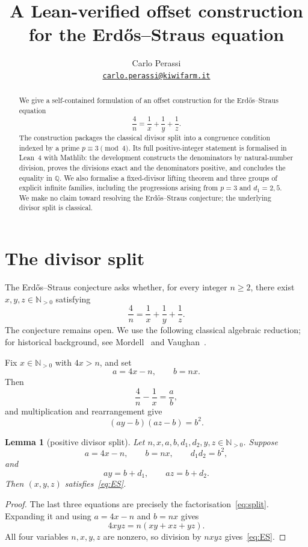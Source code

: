\documentclass[11pt]{article}
\title{A Lean-verified offset construction\\
for the Erdős--Straus equation}
\author{Carlo Perassi\\
\href{mailto:carlo.perassi@kiwifarm.it}{\texttt{carlo.perassi@kiwifarm.it}}}
\date{}
\newtheorem{lemma}[theorem]{Lemma}
\theoremstyle{remark}
\newcommand{\N}{\mathbb{N}}
\newcommand{\Q}{\mathbb{Q}}
\begin{document}
\maketitle

\begin{abstract}
We give a self-contained formulation of an offset construction for the
Erdős--Straus equation
\[
  \frac4n=\frac1x+\frac1y+\frac1z.
\]
The construction packages the classical divisor split into a congruence
condition indexed by a prime \(p\equiv3\pmod4\).  Its full positive-integer
statement is formalised in Lean~4 with Mathlib: the development constructs the
denominators by natural-number division, proves the divisions exact and the
denominators positive, and concludes the equality in \(\Q\).  We also formalise
a fixed-divisor lifting theorem and three groups of explicit infinite families,
including the progressions arising from \(p=3\) and \(d_1=2,5\).  We make no
claim toward resolving the Erdős--Straus conjecture; the underlying divisor
split is classical.
\end{abstract}

\section{The divisor split}

The Erdős--Straus conjecture asks whether, for every integer \(n\ge2\), there
exist \(x,y,z\in\N_{>0}\) satisfying
\begin{equation}\label{eq:ES}
  \frac4n=\frac1x+\frac1y+\frac1z.
\end{equation}
The conjecture remains open.  We use the following classical algebraic
reduction; for historical background, see Mordell~\cite{Mordell} and
Vaughan~\cite{Vaughan}.

Fix \(x\in\N_{>0}\) with \(4x>n\), and set
\[
  a=4x-n,\qquad b=nx.
\]
Then
\[
  \frac4n-\frac1x=\frac ab,
\]
and multiplication and rearrangement give
\begin{equation}\label{eq:split}
  (ay-b)(az-b)=b^2.
\end{equation}

\begin{lemma}[positive divisor split]\label{lem:split}
Let \(n,x,a,b,d_1,d_2,y,z\in\N_{>0}\).  Suppose
\[
  a=4x-n,\qquad b=nx,\qquad d_1d_2=b^2,
\]
and
\[
  ay=b+d_1,\qquad az=b+d_2.
\]
Then \((x,y,z)\) satisfies~\eqref{eq:ES}.
\end{lemma}

\begin{proof}
The last three equations are precisely the
factorisation~\eqref{eq:split}.  Expanding it and using \(a=4x-n\) and \(b=nx\)
gives
\[
  4xyz=n(xy+xz+yz).
\]
All four variables \(n,x,y,z\) are nonzero, so division by \(nxyz\)
gives~\eqref{eq:ES}.
\end{proof}
\end{document}
